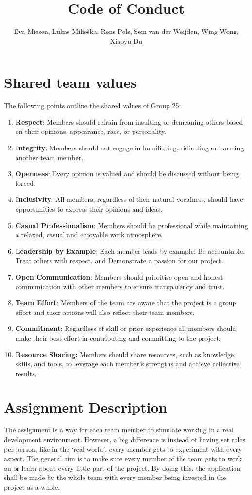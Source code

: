 \documentclass[sigconf,nonacm]{acmart}
\title{Code of Conduct}
\author{Eva Miesen, Lukas Milieška, Rens Pols, Sem van der Weijden, Wing Wong, Xiaoyu Du}
\begin{document}
\maketitle

\tableofcontents


\section{Shared team values}
The following points outline the shared values of Group 25:

\begin{enumerate}
    \item \textbf{Respect}: Members should refrain from insulting or demeaning others based on their opinions, appearance, race, or personality.
    \item \textbf{Integrity}: Members should not engage in humiliating, ridiculing or harming another team member.
    \item \textbf{Openness}: Every opinion is valued and should be discussed without being forced.
    \item \textbf{Inclusivity}: All members, regardless of their natural vocalness, should have opportunities to express their opinions and ideas.
    \item \textbf{Casual Professionalism}: Members should be professional while maintaining a relaxed, casual and enjoyable work atmosphere.
    \item \textbf{Leadership by Example}: Each member leads by example: Be accountable, Treat others with respect, and Demonstrate a passion for our project.
    \item \textbf{Open Communication}: Members should prioritise open and honest communication with other members to ensure transparency and trust.
    \item \textbf{Team Effort}: Members of the team are aware that the project is a group effort and their actions will also reflect their team members.
    \item \textbf{Commitment}: Regardless of skill or prior experience all members should make their best effort in contributing and committing to the project.
    \item \textbf{Resource Sharing:} Members should share resources, such as knowledge, skills, and tools, to leverage each member's strengths and achieve collective results.
\end{enumerate}


\section{Assignment Description}
The assignment is a way for each team member to simulate working in a real development environment. However, a big difference is instead of having set roles per person, like in the ‘real world’, every member gets to experiment with every aspect. The general aim is to make sure every member of the team gets to work on or learn about every little part of the project. By doing this, the application shall be made by the whole team with every member being invested in the project as a whole.
\end{document}
